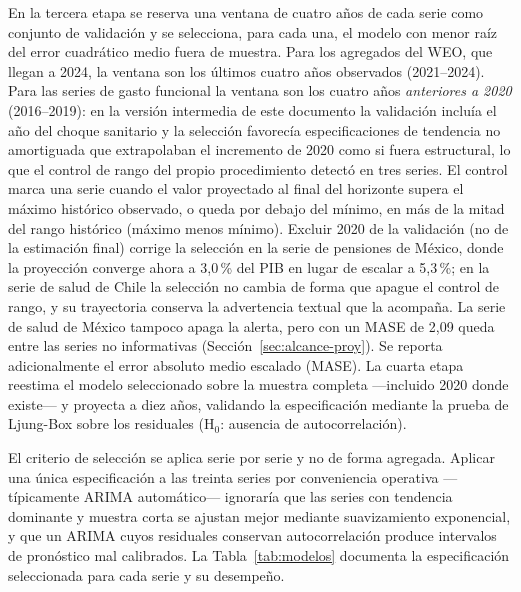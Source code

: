 \documentclass[12pt, letterpaper]{article}
\begin{document}
En la tercera etapa se reserva una ventana de cuatro años de cada serie como
conjunto de validación y se selecciona, para cada una, el modelo con menor raíz del
error cuadrático medio fuera de muestra. Para los agregados del WEO, que llegan a
2024, la ventana son los últimos cuatro años observados (2021--2024). Para las
series de gasto funcional la ventana son los cuatro años \emph{anteriores a 2020}
(2016--2019): en la versión intermedia de este documento la validación incluía el
año del choque sanitario y la selección favorecía especificaciones de tendencia no
amortiguada que extrapolaban el incremento de 2020 como si fuera estructural, lo
que el control de rango del propio procedimiento detectó en tres series. El
control marca una serie cuando el valor proyectado al final del horizonte supera el
máximo histórico observado, o queda por debajo del mínimo, en más de la mitad del
rango histórico (máximo menos mínimo). Excluir 2020 de la validación (no de la
estimación final) corrige la selección en la
serie de pensiones de México, donde la proyección converge ahora a
3{,}0\,\% del PIB en lugar de escalar a 5{,}3\,\%; en la serie de salud de Chile la
selección no cambia de forma que apague el control de rango, y su trayectoria
conserva la advertencia textual que la acompaña. La serie de salud de México
tampoco apaga la alerta, pero con un MASE de 2,09 queda entre las series no
informativas (Sección~\ref{sec:alcance-proy}). Se reporta
adicionalmente el error absoluto medio escalado (MASE). La cuarta etapa reestima el
modelo seleccionado sobre la muestra completa ---incluido 2020 donde existe--- y
proyecta a diez años, validando la especificación mediante la prueba de Ljung-Box
sobre los residuales (H$_0$: ausencia de autocorrelación).

El criterio de selección se aplica serie por serie y no de forma agregada. Aplicar una única especificación a las treinta series por
conveniencia operativa —típicamente ARIMA automático— ignoraría que las series con
tendencia dominante y muestra corta se ajustan mejor mediante suavizamiento exponencial,
y que un ARIMA cuyos residuales conservan autocorrelación produce intervalos de
pronóstico mal calibrados. La Tabla~\ref{tab:modelos} documenta la especificación
seleccionada para cada serie y su desempeño.
\end{document}
